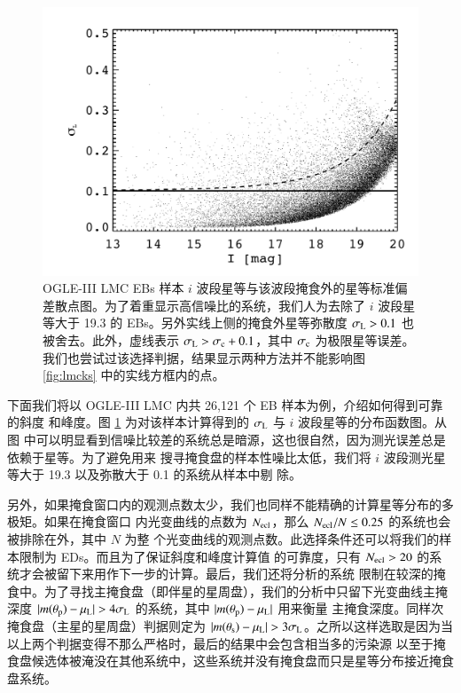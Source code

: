 \begin{figure}[ht!]
\centering
\includegraphics[width=1.0\textwidth,trim={0.4in 0.2in 0 0}]{figures/chapter3/f4_magerr.pdf}
\caption{OGLE-III LMC EBs 样本 $i$ 波段星等与该波段掩食外的星等标准偏差散点图。为了着重显示高信噪比的系统，我们人为去除了 $i$ 波段星等大于 19.3 的 EBs。另外实线上侧的掩食外星等弥散度 $\sigma_\mathrm{L} > 0.1$ 也被舍去。此外，虚线表示 $\sigma_\mathrm{L} > \sigma_\mathrm{c} + 0.1 $，其中 $\sigma_\mathrm{c}$ 为极限星等误差。我们也尝试过该选择判据，结果显示两种方法并不能影响图 \ref{fig:lmcks} 中的实线方框内的点。}
\label{fig:magerr}
\end{figure}

下面我们将以 OGLE-III LMC 内共 26,121 个 EB 样本\cite{Graczyk2011}为例，介绍如何得到可靠的斜度
和峰度。图 \ref{fig:magerr} 为对该样本计算得到的 $\sigma_\mathrm{L}$ 与 $i$ 波段星等的分布函数图。从图
中可以明显看到信噪比较差的系统总是暗源，这也很自然，因为测光误差总是依赖于星等。为了避免用来
搜寻掩食盘的样本性噪比太低，我们将 $i$ 波段测光星等大于 19.3 以及弥散大于 0.1 的系统从样本中剔
除。

另外，如果掩食窗口内的观测点数太少，我们也同样不能精确的计算星等分布的多极矩。如果在掩食窗口
内光变曲线的点数为 $N_\mathrm{ecl}$，那么 $N_\mathrm{ecl}/N \le 0.25$ 的系统也会被排除在外，其中 $N$ 为整
个光变曲线的观测点数。此选择条件还可以将我们的样本限制为 EDs。而且为了保证斜度和峰度计算值
的可靠度，只有 $N_\mathrm{ecl} > 20$ 的系统才会被留下来用作下一步的计算。最后，我们还将分析的系统
限制在较深的掩食中。为了寻找主掩食盘（即伴星的星周盘），我们的分析中只留下光变曲线主掩深度 $|
m(\theta_\mathrm{p}) - \mu_\mathrm{L}| > 4 \sigma_\mathrm{L}$ 的系统，其中 $|m(\theta_\mathrm{p})  - \mu_\mathrm{L}|$ 用来衡量
主掩食深度。同样次掩食盘（主星的星周盘）判据则定为 $|m(\theta_\mathrm{s}) - \mu_\mathrm{L}| > 3 \sigma_
\mathrm{L}$。之所以这样选取是因为当以上两个判据变得不那么严格时，最后的结果中会包含相当多的污染源
以至于掩食盘候选体被淹没在其他系统中，这些系统并没有掩食盘而只是星等分布接近掩食盘系统。

